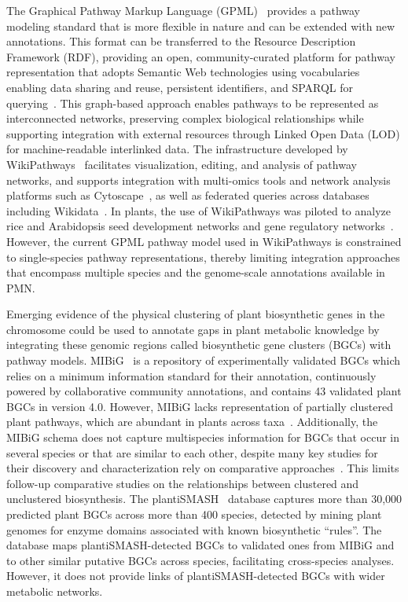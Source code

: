 \documentclass[11pt,a4paper]{article}
\begin{document}
The Graphical Pathway Markup Language (GPML)~\cite{kutmon2015} provides a pathway modeling standard
that is more flexible in nature and can be extended with new annotations. This format can be
transferred to the Resource Description Framework (RDF), providing an open, community-curated
platform for pathway representation that adopts Semantic Web technologies using vocabularies enabling
data sharing and reuse, persistent identifiers, and SPARQL for querying~\cite{waagmeester2016}. This
graph-based approach enables pathways to be represented as interconnected networks, preserving
complex biological relationships while supporting integration with external resources through Linked
Open Data (LOD) for machine-readable interlinked data. The infrastructure developed by
WikiPathways~\cite{agrawal2024} facilitates visualization, editing, and analysis of pathway networks,
and supports integration with multi-omics tools and network analysis platforms such as
Cytoscape~\cite{shannon2003}, as well as federated queries across databases including
Wikidata~\cite{waagmeester2020}. In plants, the use of WikiPathways was piloted to analyze rice and
Arabidopsis seed development networks and gene regulatory networks~\cite{hanumappa2013}. However, the
current GPML pathway model used in WikiPathways is constrained to single-species pathway
representations, thereby limiting integration approaches that encompass multiple species and the
genome-scale annotations available in PMN.

Emerging evidence of the physical clustering of plant biosynthetic genes in the chromosome could be
used to annotate gaps in plant metabolic knowledge by integrating these genomic regions called
biosynthetic gene clusters (BGCs) with pathway models. MIBiG~\cite{zdouc2025} is a repository of
experimentally validated BGCs which relies on a minimum information standard for their annotation,
continuously powered by collaborative community annotations, and contains 43 validated plant BGCs in
version 4.0. However, MIBiG lacks representation of partially clustered plant pathways, which are
abundant in plants across taxa~\cite{itkin2013}. Additionally, the MIBiG schema does not capture
multispecies information for BGCs that occur in several species or that are similar to each other,
despite many key studies for their discovery and characterization rely on comparative
approaches~\cite{franke2019,li2021}. This limits follow-up comparative studies on the relationships
between clustered and unclustered biosynthesis. The plantiSMASH~\cite{delpup2026} database captures
more than 30,000 predicted plant BGCs across more than 400 species, detected by mining plant genomes
for enzyme domains associated with known biosynthetic ``rules''. The database maps
plantiSMASH-detected BGCs to validated ones from MIBiG and to other similar putative BGCs across
species, facilitating cross-species analyses. However, it does not provide links of
plantiSMASH-detected BGCs with wider metabolic networks.
\end{document}
